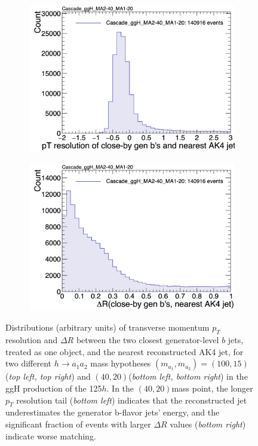 \begin{figure}[ht]
\begin{subfigure}{0.45\textwidth}
        \includegraphics[width=1.0\textwidth]{figures/ch-11-asymmetric/Cascade_ggH_MA2-40_MA1-20_pt_resolution_ak4_leadingPair}
    \end{subfigure}
    \hfill
    \begin{subfigure}{0.45\textwidth}
        \includegraphics[width=1.0\textwidth]{figures/ch-11-asymmetric/Cascade_ggH_MA2-40_MA1-20_deltaR_ak4_leadingPair}
    \end{subfigure}     
    \caption{Distributions (arbitrary units) of transverse momentum $p_{T}$ resolution and $\Delta R$ between the two closest generator-level $b$ jets, treated as one object, and the nearest reconstructed AK4 jet, for two different $h\rightarrow a_1 a_2$ mass hypotheses $(m_{a_1}, m_{a_2}) = (100, 15)$\GeV (\textit{top left, top right}) and $(40, 20)$\GeV (\textit{bottom left, bottom right}) in the ggH production of the 125\GeV $h$. In the $(40, 20)$\GeV mass point, the longer $p_{T}$ resolution tail (\textit{bottom left}) indicates that the reconstructed jet underestimates the generator b-flavor jets' energy, and the significant fraction of events with larger $\Delta R$ values (\textit{bottom right}) indicate worse matching.}
    \label{fig:cascade_matching_to_AK4_jets}
\end{figure}



